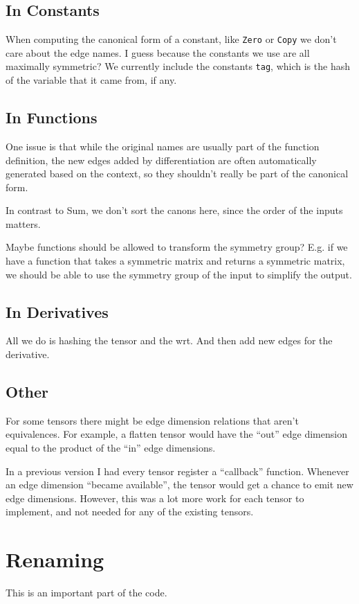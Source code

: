 \subsection{In Constants}
When computing the canonical form of a constant, like \texttt{Zero} or \texttt{Copy} we don't care about the edge names.
I guess because the constants we use are all maximally symmetric?
We currently include the constants \texttt{tag}, which is the hash of the variable that it came from, if any.

\subsection{In Functions}
One issue is that while the original names are usually part of the function definition,
the new edges added by differentiation are often automatically generated based on the context,
so they shouldn't really be part of the canonical form.

In contrast to Sum, we don't sort the canons here, since the order of the inputs matters.

Maybe functions should be allowed to transform the symmetry group?
E.g. if we have a function that takes a symmetric matrix and returns a symmetric matrix, we should be able to use the symmetry group of the input to simplify the output.

\subsection{In Derivatives}
All we do is hashing the tensor and the wrt.
And then add new edges for the derivative.

\subsection{Other}
For some tensors there might be edge dimension relations that aren't equivalences.
For example, a flatten tensor would have the ``out'' edge dimension equal to the product of the ``in'' edge dimensions.

In a previous version I had every tensor register a ``callback'' function.
Whenever an edge dimension ``became available'', the tensor would get a chance to emit new edge dimensions.
However, this was a lot more work for each tensor to implement, and not needed for any of the existing tensors.

\section{Renaming}
This is an important part of the code.

